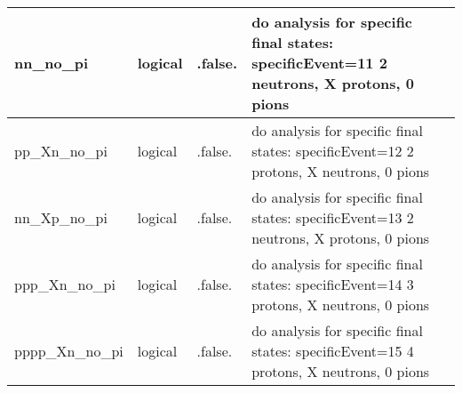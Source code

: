 \documentclass{article}
\begin{document}
\begin{longtable}{llll}
\midrule
nn\_no\_pi & \begin{minipage}[t]{2cm}logical\end{minipage} & \begin{minipage}[t]{2cm}.false.\end{minipage} & \begin{minipage}[t]{12cm}do analysis for specific final states: specificEvent=11 2 neutrons, X protons, 0 pions\end{minipage}\\*
\midrule
pp\_Xn\_no\_pi & \begin{minipage}[t]{2cm}logical\end{minipage} & \begin{minipage}[t]{2cm}.false.\end{minipage} & \begin{minipage}[t]{12cm}do analysis for specific final states: specificEvent=12 2 protons, X neutrons, 0 pions\end{minipage}\\*
\midrule
nn\_Xp\_no\_pi & \begin{minipage}[t]{2cm}logical\end{minipage} & \begin{minipage}[t]{2cm}.false.\end{minipage} & \begin{minipage}[t]{12cm}do analysis for specific final states: specificEvent=13 2 neutrons, X protons, 0 pions\end{minipage}\\*
\midrule
ppp\_Xn\_no\_pi & \begin{minipage}[t]{2cm}logical\end{minipage} & \begin{minipage}[t]{2cm}.false.\end{minipage} & \begin{minipage}[t]{12cm}do analysis for specific final states: specificEvent=14 3 protons, X neutrons, 0 pions\end{minipage}\\*
\midrule
pppp\_Xn\_no\_pi & \begin{minipage}[t]{2cm}logical\end{minipage} & \begin{minipage}[t]{2cm}.false.\end{minipage} & \begin{minipage}[t]{12cm}do analysis for specific final states: specificEvent=15 4 protons, X neutrons, 0 pions\end{minipage}\\*

\end{longtable}
\end{document}
